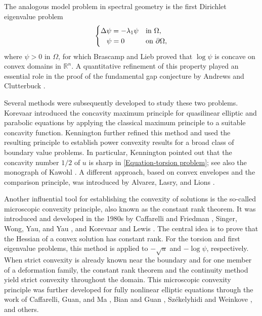 \documentclass[11pt]{amsart}
\numberwithin{theorem}{section}
\numberwithin{equation}{section}
\begin{document}
The analogous model problem in spectral geometry is the first Dirichlet eigenvalue problem
\begin{equation}\label{Equation-eigenvalue problem}
\begin{cases}
\Delta\psi=-\lambda_1\psi & \mathrm{in}\ \Omega,\\
\hspace{0.3cm}\psi=0 & \mathrm{on}\ \partial\Omega,
\end{cases}
\end{equation}
where $\psi>0$ in $\Omega$, for which Brascamp and Lieb \cite{Brascamp-Lieb1976} proved that $\log\psi$ is concave on convex domains in $\mathbb{R}^n$. A quantitative refinement of this property played an essential role in the proof of the fundamental gap conjecture by Andrews and Clutterbuck \cite{Andrews-Clutterbuck2011}.

Several methods were subsequently developed to study these two problems. Korevaar \cite{Korevaar1983b} introduced the concavity maximum principle for quasilinear elliptic and parabolic equations by applying the classical maximum principle to a suitable concavity function. Kennington \cite{Kennington1985} further refined this method and used the resulting principle to establish power convexity results for a broad class of boundary value problems. In particular, Kennington pointed out that the concavity number $1/2$ of $u$ is sharp in \eqref{Equation-torsion problem}; see also the monograph of Kawohl \cite{Kawohl1985}. A different approach, based on convex envelopes and the comparison principle, was introduced by Alvarez, Lasry, and Lions \cite{Alvarez-LL1997}.

Another influential tool for establishing the convexity of solutions is the so-called microscopic convexity principle, also known as the constant rank theorem. It was introduced and developed in the 1980s by Caffarelli and Friedman \cite{Caffarelli-Friedman1985}, Singer, Wong, Yau, and Yau \cite{Singer-WYY1985}, and Korevaar and Lewis \cite{Korevaar-Lewis1987}. The central idea is to prove that the Hessian of a convex solution has constant rank. For the torsion and first eigenvalue problems, this method is applied to $-\sqrt{u}$ and $-\log\psi$, respectively. When strict convexity is already known near the boundary and for one member of a deformation family, the constant rank theorem and the continuity method yield strict convexity throughout the domain. This microscopic convexity principle was further developed for fully nonlinear elliptic equations through the work of Caffarelli, Guan, and Ma \cite{Caffarelli-GM2007}, Bian and Guan \cite{Bian-Guan2009}, Sz\'ekelyhidi and Weinkove \cite{Szekelyhidi-Weinkove2016}, and others.
\end{document}
